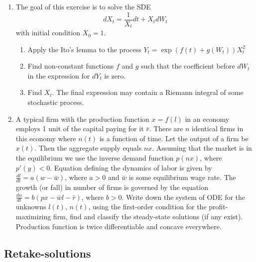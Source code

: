 \documentclass[12pt, a4paper]{article}
\begin{document}
\begin{enumerate}[resume]
\item The goal of this exercise is to solve the SDE
\begin{equation}
dX_t=\frac{1}{X_t}dt+X_tdW_t \nonumber
\end{equation}
with initial condition  $X_0=1$.
\begin{enumerate}
\item Apply the Ito's lemma to the process $Y_t=\exp(f(t)+g(W_t))X_t^2$
\item Find non-constant functions $f$ and $g$ such that the coefficient before $dW_t$ in the expression for $dY_t$ is zero.
\item Find $X_t$. The final expression may contain a Riemann integral of some stochastic process.
\end{enumerate}

\item A typical firm with the production function $x=f(l)$ in an economy employs 1 unit of the capital paying for it $\bar{r}$. There are $n$ identical firms in this economy where $n(t)$ is a function of time. Let the output of a firm be $x(t)$. Then the aggregate supply equals $nx$. Assuming that the market is in the equilibrium we use the inverse demand function $p(nx)$, where $p'(y)<0$. Equation defining the dynamics of labor is given by $\frac{dl}{dt}=a(w-\bar{w})$, where $a>0$  and $\bar{w}$  is some equilibrium wage rate. The growth (or fall) in number of firms is governed by the equation $\frac{dn}{dt}=b(px-\bar{w}l-\bar{r})$, where $b>0$. Write down the system of ODE for the unknowns $l(t)$, $n(t)$, using the first-order condition for the profit-maximizing firm, find and classify the steady-state solutions (if any exist). Production function is twice differentiable and concave everywhere.

\end{enumerate}

\subsection{Retake-solutions}
\end{document}
